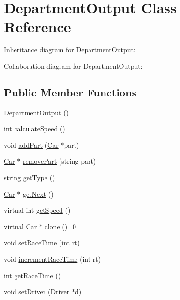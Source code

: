 \hypertarget{classDepartmentOutput}{}\section{Department\+Output Class Reference}
\label{classDepartmentOutput}


Inheritance diagram for Department\+Output\+:


Collaboration diagram for Department\+Output\+:
\subsection*{Public Member Functions}
\begin{DoxyCompactItemize}
\item 
\hyperlink{classDepartmentOutput_af48d2aeafaead9c3f77c506112d80ca8}{Department\+Output} ()
\item 
int \hyperlink{classDepartmentOutput_a34d5c432ee7e7e8a33a4e8099a2c751f}{calculate\+Speed} ()
\item 
void \hyperlink{classDepartmentOutput_a8b39539ad1ca3d8026d53dd5ab88be97}{add\+Part} (\hyperlink{classCar}{Car} $\ast$part)
\item 
\hyperlink{classCar}{Car} $\ast$ \hyperlink{classDepartmentOutput_a8bd91d321113668938ecb8fb549d972c}{remove\+Part} (string part)
\item 
string \hyperlink{classDepartmentOutput_a9366794b5b64ed37cf37ed6443eecf01}{get\+Type} ()
\item 
\hyperlink{classCar}{Car} $\ast$ \hyperlink{classDepartmentOutput_ab12d572677cc6c3a4b32cc1c5894f54e}{get\+Next} ()
\item 
virtual int \hyperlink{classDepartmentOutput_a90caf8934a687d18b9855f19a421ecef}{get\+Speed} ()
\item 
virtual \hyperlink{classCar}{Car} $\ast$ \hyperlink{classDepartmentOutput_ab20c9d559bca6ce8e6748dfac47c3f84}{clone} ()=0
\item 
void \hyperlink{classDepartmentOutput_a99c1b2cf729b25bc2f1d48214019c678}{set\+Race\+Time} (int rt)
\item 
void \hyperlink{classDepartmentOutput_a64f6b8afd2702b4d223c4cac0909b470}{increment\+Race\+Time} (int rt)
\item 
int \hyperlink{classDepartmentOutput_af4807c0cdde8488cd922be5d15a0f59b}{get\+Race\+Time} ()
\item 
void \hyperlink{classDepartmentOutput_aa045362e5763d57a2c888b98c677773c}{set\+Driver} (\hyperlink{classDriver}{Driver} $\ast$d)

\end{DoxyCompactItemize}
